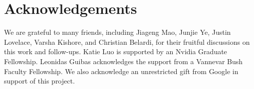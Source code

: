 \documentclass[runningheads]{llncs}
\begin{document}







% 

\section*{Acknowledgements}
We are grateful to many friends,
including Jiageng Mao, Junjie Ye, Justin Lovelace, Varsha Kishore, and Christian Belardi, for their fruitful discussions on this work and follow-ups. Katie Luo is supported by an Nvidia Graduate Fellowship. Leonidas Guibas acknowledges the support from a Vannevar Bush Faculty Fellowship. We also acknowledge an unrestricted gift from Google in support of this project.





\clearpage

\end{document}
